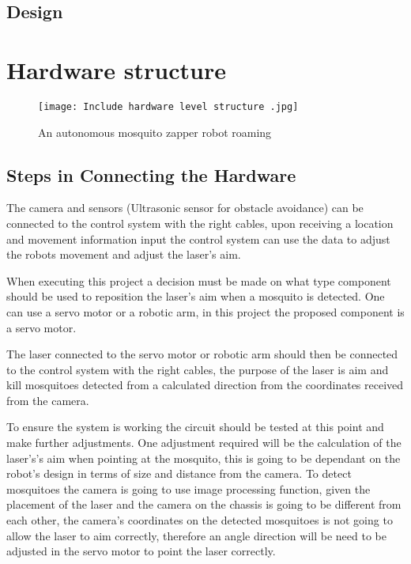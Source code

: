 \documentclass[11pt]{article}
\begin{document}
 	
 \subsection{Design}
 
 
 
 
 
 	\section{Hardware structure}
 	 
 	
 	\begin{center}
 		
 		
 		\begin{figure}[H]
 			\centering
 			\texttt{[image: Include hardware level structure .jpg]}
 			\caption{An autonomous mosquito zapper robot roaming }
 			\label{fig:robot}
 		\end{figure}
 	\end{center}
 	
 	

 
 	 	\subsection{Steps in Connecting the Hardware}
 	 	
 	 	The camera and sensors (Ultrasonic sensor for obstacle avoidance) can be connected to the control system with the  right cables, upon receiving a location and movement information input the control system can use the data to adjust the robots movement and adjust the laser's aim.
 	
 	When executing this project a decision must be made on what type component should be used to reposition the laser's aim when a mosquito is detected. One can use a servo motor or a robotic arm, in this project the proposed component is a servo motor.
 	
 	


 The laser connected to the servo motor or robotic arm should then be connected to the control system with the right cables, the purpose of the laser is aim and kill mosquitoes detected from a calculated direction from the coordinates received from the camera.
 
 To ensure the system is working the circuit should be tested at this point and make further adjustments.
 	One adjustment required will be the calculation of the laser's's aim when pointing at the mosquito, this is going to be dependant on the robot's design in terms of size and distance from the camera. To detect mosquitoes the camera is going to use image processing function, given the placement of the laser and the camera  on the chassis is going to be different from each other, the camera's coordinates on the detected mosquitoes is not going to allow the laser to aim correctly, therefore an angle direction will be need to be adjusted in the servo motor to point the laser correctly.
 	
\end{document}
